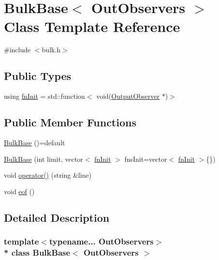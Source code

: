 \hypertarget{class_bulk_base}{}\section{Bulk\+Base$<$ Out\+Observers $>$ Class Template Reference}
\label{class_bulk_base}


{\ttfamily \#include $<$bulk.\+h$>$}

\subsection*{Public Types}
\begin{DoxyCompactItemize}
\item 
using \hyperlink{class_bulk_base_ad7331d3366a082a94ca04a3201dfc94c}{fn\+Init} = std\+::function$<$ void(\hyperlink{struct_output_observer}{Output\+Observer} $\ast$)$>$
\end{DoxyCompactItemize}
\subsection*{Public Member Functions}
\begin{DoxyCompactItemize}
\item 
\hyperlink{class_bulk_base_a63b25f6d98030224778baf357157631b}{Bulk\+Base} ()=default
\item 
\hyperlink{class_bulk_base_aeb17064f4fedbf1584feb60199bbf649}{Bulk\+Base} (int limit, vector$<$ \hyperlink{class_bulk_base_ad7331d3366a082a94ca04a3201dfc94c}{fn\+Init} $>$ fns\+Init=vector$<$ \hyperlink{class_bulk_base_ad7331d3366a082a94ca04a3201dfc94c}{fn\+Init} $>$\{\})
\item 
void \hyperlink{class_bulk_base_a3c920e9c377f87728b9d6aaf5116e824}{operator()} (string \&line)
\item 
void \hyperlink{class_bulk_base_aff6263fd52d47be936676a1afa890a4a}{eof} ()
\end{DoxyCompactItemize}


\subsection{Detailed Description}
\subsubsection*{template$<$typename... Out\+Observers$>$\\*
class Bulk\+Base$<$ Out\+Observers $>$}



